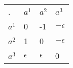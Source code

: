 \begin{center}
    \begin{tabular}{llll}
    .                          & $a^1$      & $a^2$      & $a^3$                            \\ \cline{2-4}
    \multicolumn{1}{l|}{$a^1$} & 0          & -1         & \multicolumn{1}{l|}{$-\epsilon$} \\
    \multicolumn{1}{l|}{$a^2$} & 1          & 0          & \multicolumn{1}{l|}{$-\epsilon$} \\
    \multicolumn{1}{l|}{$a^3$} & $\epsilon$ & $\epsilon$ & \multicolumn{1}{l|}{0}           \\ \cline{2-4}
    \end{tabular}
\end{center}